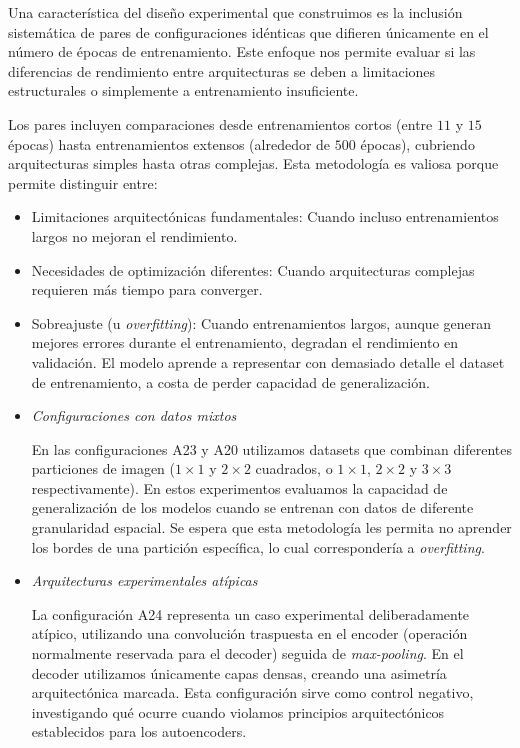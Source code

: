 Una característica del diseño experimental que construimos es la inclusión sistemática de pares de configuraciones idénticas que difieren únicamente en el número de épocas de entrenamiento. Este enfoque nos permite evaluar si las diferencias de rendimiento entre arquitecturas se deben a limitaciones estructurales o simplemente a entrenamiento insuficiente.

Los pares incluyen comparaciones desde entrenamientos cortos (entre $11$ y $15$ épocas) hasta entrenamientos extensos (alrededor de $500$ épocas), cubriendo arquitecturas simples hasta otras complejas. Esta metodología es valiosa porque permite distinguir entre:

\begin{itemize}
    \item Limitaciones arquitectónicas fundamentales: Cuando incluso entrenamientos largos no mejoran el rendimiento.
    \item Necesidades de optimización diferentes: Cuando arquitecturas complejas requieren más tiempo para converger.
    \item Sobreajuste (u \emph{overfitting}): Cuando entrenamientos largos, aunque generan mejores errores durante el entrenamiento, degradan el rendimiento en validación. El modelo aprende a representar con demasiado detalle el dataset de entrenamiento, a costa de perder capacidad de generalización.
\end{itemize}


\begin{itemize}
    \item \emph{Configuraciones con datos mixtos}

    En las configuraciones A23 y A20 utilizamos datasets que combinan diferentes particiones de imagen ($1\times1$ y $2\times2$ cuadrados, o $1\times1$, $2\times2$ y $3\times3$ respectivamente). En estos experimentos evaluamos la capacidad de generalización de los modelos cuando se entrenan con datos de diferente granularidad espacial. Se espera que esta metodología les permita no aprender los bordes de una partición específica, lo cual correspondería a \emph{overfitting}.

    \item \emph{Arquitecturas experimentales atípicas}

    La configuración A24 representa un caso experimental deliberadamente atípico, utilizando una convolución traspuesta en el encoder (operación normalmente reservada para el decoder) seguida de \emph{max-pooling}. En el decoder utilizamos únicamente capas densas, creando una asimetría arquitectónica marcada. Esta configuración sirve como control negativo, investigando qué ocurre cuando violamos principios arquitectónicos establecidos para los autoencoders.
\end{itemize}

